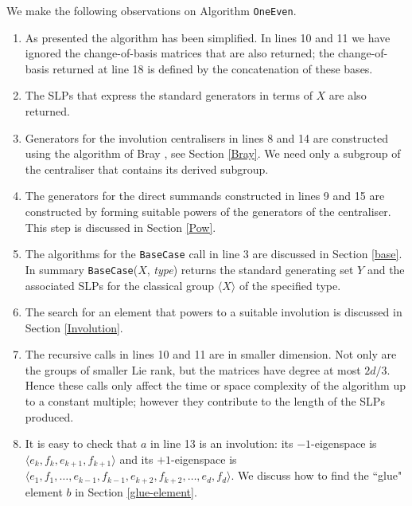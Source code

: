 \documentclass[12pt]{article}
\begin{document}
We make the following observations on Algorithm {\tt OneEven}. 
\begin{enumerate}
\item 
As presented the algorithm has been simplified. 
In lines 10 and 11 we have ignored
the change-of-basis matrices that are also returned; the change-of-basis 
returned at line 18 is defined by the concatenation of these bases.

\item 
The SLPs that express the standard generators 
in terms of $X$ are also returned.

\item 
Generators for the involution centralisers in lines 
8 and 14 are constructed using the algorithm of Bray \cite{Bray},
see Section \ref{Bray}. 
We need only a subgroup of the centraliser that 
contains its derived subgroup. 

\item 
The generators for the direct summands
constructed in lines 9 and 15 are constructed by forming suitable powers of
the generators of the centraliser. This step is discussed in
Section \ref{Pow}.

\item 
The algorithms for the {\tt BaseCase} call in line 3 are 
discussed in Section \ref{base}.
In summary {\tt BaseCase}($X$, {\it type}) returns
the standard generating set $Y$ and the associated SLPs
for the classical group $\langle X \rangle$ of the specified type. 

\item 
The search for an element that powers to a suitable involution is
discussed in Section \ref{Involution}.

\item 
The recursive calls in lines 10 and 11 are
in smaller dimension. Not only are the groups of
smaller Lie rank, but the matrices have degree at most $2d/3$.
Hence these calls only affect the time or space complexity of the
algorithm up to a constant multiple; however they contribute to the length of
the SLPs produced.

\item 
It is easy to check that $a$ in line 13 is an involution: 
its $-1$-eigenspace is $\langle e_k,f_k,e_{k+1},f_{k+1}\rangle$ and its
$+1$-eigenspace is
$\langle e_1,f_1,\ldots, e_{k - 1}, f_{k-1}, e_{k+2},f_{k+2}, \ldots, e_d, f_d \rangle$.
We discuss how to find the ``glue" element $b$ in Section \ref{glue-element}.
\end{enumerate}
 
\end{document}
